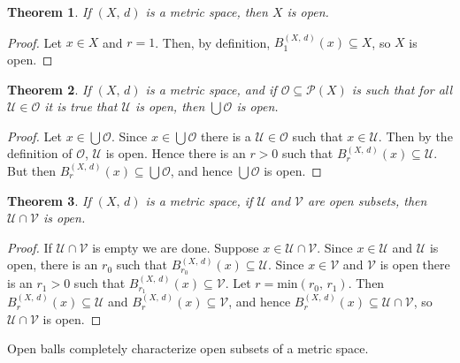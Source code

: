 \documentclass{article}
\theoremstyle{plain}
\newtheorem{theorem}{Theorem}[section]
\theoremstyle{normal}
\begin{document}
        \begin{theorem}
            If $(X,\,d)$ is a metric space, then
            $X$ is open.
        \end{theorem}
        \begin{proof}
            Let $x\in{X}$ and $r=1$. Then, by definition,
            $B_{1}^{(X,\,d)}(x)\subseteq{X}$, so $X$ is open.
        \end{proof}
        \begin{theorem}
            If $(X,\,d)$ is a metric space, and if
            $\mathcal{O}\subseteq\mathcal{P}(X)$ is such that for all
            $\mathcal{U}\in\mathcal{O}$ it is true that $\mathcal{U}$ is open,
            then $\bigcup\mathcal{O}$ is open.
        \end{theorem}
        \begin{proof}
            Let $x\in\bigcup\mathcal{O}$. Since $x\in\bigcup\mathcal{O}$
            there is a $\mathcal{U}\in\mathcal{O}$ such that
            $x\in\mathcal{U}$. Then by the definition of
            $\mathcal{O}$, $\mathcal{U}$ is open. Hence there is an
            $r>0$ such that $B_{r}^{(X,\,d)}(x)\subseteq\mathcal{U}$.
            But then $B_{r}^{(X,\,d)}(x)\subseteq\bigcup\mathcal{O}$, and
            hence $\bigcup\mathcal{O}$ is open.
        \end{proof}
        \begin{theorem}
            If $(X,\,d)$ is a metric space, if $\mathcal{U}$ and
            $\mathcal{V}$ are open subsets, then
            $\mathcal{U}\cap\mathcal{V}$ is open.
        \end{theorem}
        \begin{proof}
            If $\mathcal{U}\cap\mathcal{V}$ is empty we are done.
            Suppose $x\in\mathcal{U}\cap\mathcal{V}$. Since
            $x\in\mathcal{U}$ and $\mathcal{U}$ is open, there is an
            $r_{0}$ such that
            $B_{r_{0}}^{(X,\,d)}(x)\subseteq\mathcal{U}$. Since
            $x\in\mathcal{V}$ and $\mathcal{V}$ is open there is an
            $r_{1}>0$ such that $B_{r_{1}}^{(X,\,d)}(x)\subseteq\mathcal{V}$.
            Let $r=\textrm{min}(r_{0},\,r_{1})$. Then
            $B_{r}^{(X,\,d)}(x)\subseteq\mathcal{U}$ and
            $B_{r}^{(X,\,d)}(x)\subseteq\mathcal{V}$, and hence
            $B_{r}^{(X,\,d)}(x)\subseteq\mathcal{U}\cap\mathcal{V}$, so
            $\mathcal{U}\cap\mathcal{V}$ is open.
        \end{proof}
        Open balls completely characterize open subsets of a metric space.
\end{document}
